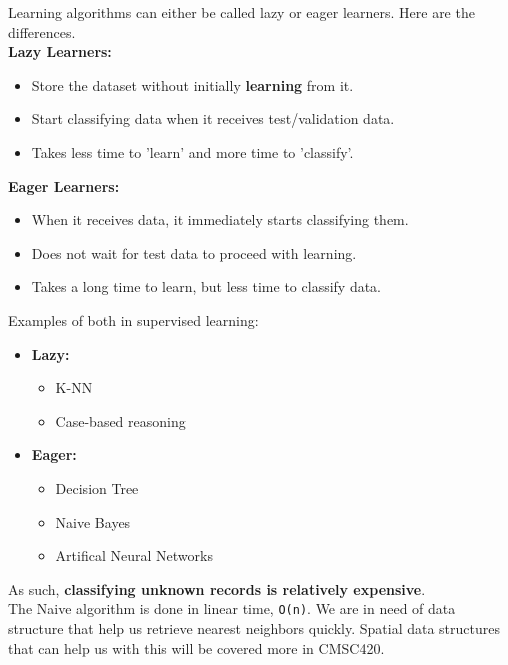 \documentclass[english, 10pt]{article}
\begin{document}
\begin{tcolorbox}[title=Aside: Lazy vs. Eager Learners,colframe=black,colback=white,arc=0pt,fonttitle=\bfseries]

Learning algorithms can either be called lazy or eager learners. Here are the differences.\\

\textbf{Lazy Learners:}
\begin{itemize}
	\item Store the dataset without initially \textbf{learning} from it.
	\item Start classifying data when it receives test/validation data.
	\item Takes less time to 'learn' and more time to 'classify'.
\end{itemize}

\hfill \break \textbf{Eager Learners:}
\begin{itemize}
	\item When it receives data, it immediately starts classifying them.
	\item Does not wait for test data to proceed with learning.
	\item Takes a long time to learn, but less time to classify data.
\end{itemize}

\hfill \break Examples of both in supervised learning:
\begin{itemize}
	\item \textbf{Lazy:}
	\begin{itemize}
		\item K-NN
		\item Case-based reasoning
	\end{itemize}
	\item \textbf{Eager:}
	\begin{itemize}
		\item Decision Tree
		\item Naive Bayes
		\item Artifical Neural Networks
	\end{itemize}
\end{itemize}

\end{tcolorbox}

As such, \textbf{classifying unknown records is relatively expensive}.\\

The Naive algorithm is done in linear time, \texttt{O(n)}. We are in need of data structure that help us retrieve nearest neighbors quickly. Spatial data structures that can help us with this will be covered more in CMSC420.
\end{document}
